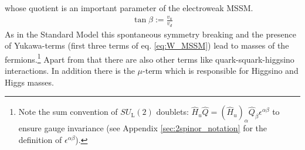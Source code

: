 whose quotient is an important parameter of the electroweak MSSM.
\begin{align}
\tan \beta := \frac{v_u}{v_d}
\end{align}
As in the Standard Model this spontaneous symmetry breaking and the presence of Yukawa-terms (first three terms of eq. \eqref{eq:W_MSSM}) lead to masses of the fermions.\footnote{Note the sum convention of $SU_{\mathrm{L}}(2)$ doublets: $\hat{H}_u \hat{Q} =  (\hat{H}_u)_{\alpha}\hat{Q}_\beta \epsilon^{\alpha\beta}$ to ensure gauge invariance (see Appendix \ref{sec:2spinor_notation} for the definition of $\epsilon^{\alpha\beta}$).} Apart from that there are also other terms like quark-squark-higgsino interactions. In addition there is the $\mu$-term which is responsible for Higgsino and Higgs masses.\\


